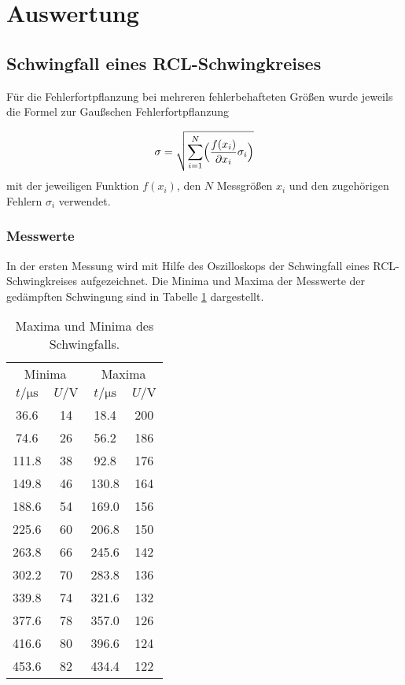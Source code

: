 \newpage
\section{Auswertung}
\label{sec:Auswertung}

\subsection{Schwingfall eines RCL-Schwingkreises}

Für die Fehlerfortpflanzung bei mehreren fehlerbehafteten Größen wurde jeweils
die Formel zur Gaußschen Fehlerfortpflanzung

\begin{equation}
  \sigma = \sqrt{\sum_{i=1}^{N}\Bigl(\frac{f(x_i)}{\partial x_i}
  \sigma_i\Bigr)}
\end{equation}
mit der jeweiligen Funktion $f(x_i)$, den $N$ Messgrößen $x_i$ und den
zugehörigen Fehlern $\sigma_i$ verwendet.

\subsubsection{Messwerte}

In der ersten Messung wird mit Hilfe des Oszilloskops der Schwingfall eines
RCL-Schwingkreises aufgezeichnet. Die Minima und Maxima der Messwerte der
gedämpften Schwingung sind in Tabelle \ref{tab:Schwingfall} dargestellt.

\begin{table}[h]
  \centering
  \begin{tabular}{c c c c}
    \toprule
    \multicolumn{2}{c}{Minima} & \multicolumn{2}{c}{Maxima} \\
    $t/\si{\micro\second}$ & $U/\si{\V}$
    & $t/\si{\micro\second}$ & $U/\si{\V}$  \\
    \midrule
    36.6 & 14 & 18.4 & 200 \\
    74.6 & 26 & 56.2 & 186 \\
    111.8 & 38 & 92.8 & 176 \\
    149.8 & 46 & 130.8 & 164 \\
    188.6 & 54 & 169.0 & 156 \\
    225.6 & 60 & 206.8 & 150 \\
    263.8 & 66 & 245.6 & 142 \\
    302.2 & 70 & 283.8 & 136 \\
    339.8 & 74 & 321.6 & 132 \\
    377.6 & 78 & 357.0 & 126 \\
    416.6 & 80 & 396.6 & 124 \\
    453.6 & 82 & 434.4 & 122 \\
    \bottomrule
  \end{tabular}
  \caption{Maxima und Minima des Schwingfalls.}
  \label{tab:Schwingfall}
\end{table}

